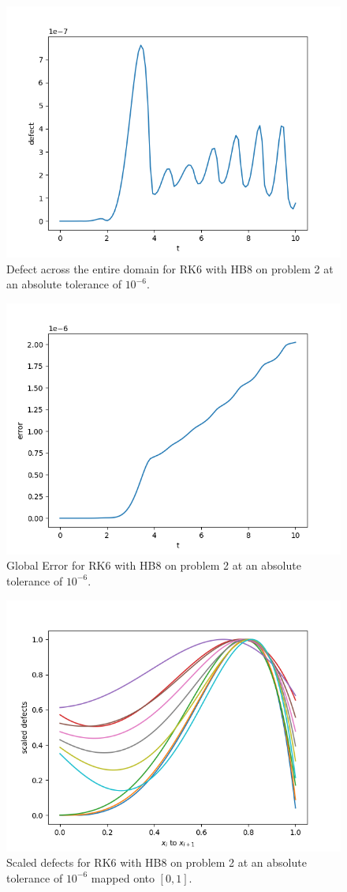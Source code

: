 \begin{figure}[H]
\centering
\includegraphics[width=0.7\linewidth]{./figures/rk6_with_hb8_p2_global_defect}
\caption{Defect across the entire domain for RK6 with HB8 on problem 2 at an absolute tolerance of $10^{-6}$.}
\label{fig:rk6_with_hb8_p2_global_defect}
\end{figure}

\begin{figure}[H]
\centering
\includegraphics[width=0.7\linewidth]{./figures/rk6_with_hb8_p2_global_error}
\caption{Global Error for RK6 with HB8 on problem 2 at an absolute tolerance of $10^{-6}$.}
\label{fig:rk6_with_hb8_p2_global_error}
\end{figure}

\begin{figure}[H]
\centering
\includegraphics[width=0.7\linewidth]{./figures/rk6_with_hb8_p2_scaled_defects}
\caption{Scaled defects for RK6 with HB8 on problem 2 at an absolute tolerance of $10^{-6}$ mapped onto $[0, 1]$.}
\label{fig:rk6_with_hb8_p2_scaled_defects}
\end{figure}

